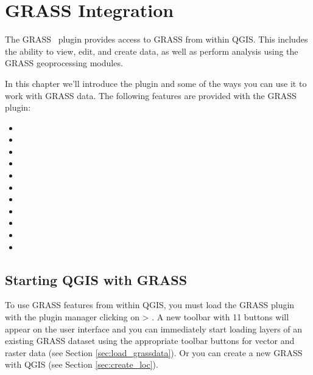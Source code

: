 \section{GRASS Integration}\label{sec:grass}

\updatedisclaimer

The GRASS~\cite{GRASSweb} plugin provides access to GRASS from within QGIS. 
This includes the ability to view, edit, and create data, as well as perform 
analysis using the GRASS geoprocessing modules.

In this chapter we'll introduce the plugin and some of the ways you can use 
it to work with GRASS data. The following features are provided with the GRASS 
plugin:
 
\begin{itemize}
\item {}
\item {}
\item {}
\item {}
\item {} 
\item {}
\item {}
\item {}
\item {}
\item {}
\item {}
\end{itemize}

\subsection{Starting QGIS with GRASS}\label{sec:starting_grass}

To use GRASS features from within QGIS, you must load the GRASS plugin with
the plugin manager clicking on  > .
A new toolbar with 11 buttons will appear on the user interface and you can
immediately start loading layers of an existing GRASS dataset
 using the appropriate toolbar buttons for vector and
raster data (see Section \ref{sec:load_grassdata}). Or you can create a new
GRASS  with QGIS (see Section \ref{sec:create_loc}).

